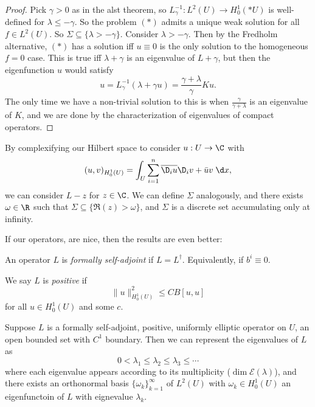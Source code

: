 \documentclass[a4paper]{article}
\begin{document}
\begin{proof}
  Pick $\gamma > 0$ as in the alst theorem, so $L_\gamma^{-1}: L^2(U) \to H_0^1(*U)$ is well-defined for $\lambda \leq -\gamma$. So the problem $(*)$ admits a unique weak solution for all $f \in L^2(U)$. So $\Sigma \subseteq \{\lambda > - \gamma\}$. Consider $\lambda > -\gamma$. Then by the Fredholm alternative, $(*)$ has a solution iff $u \equiv 0$ is the only solution to the homogeneous $f = 0$ case. This is true iff $\lambda + \gamma$ is an eigenvalue of $L + \gamma$, but then the eigenfunction $u$ would satisfy
  \[
    u = L_\gamma^{-1}(\lambda + \gamma u) = \frac{\gamma + \lambda}{\gamma }Ku.
  \]
  The only time we have a non-trivial solution to this is when $\frac{\gamma}{\gamma + \lambda}$ is an eigenvalue of $K$, and we are done by the characterization of eigenvalues of compact operators.
\end{proof}

By complexifying our Hilbert space to consider $u: U \to \C$ with
\[
  (u, v)_{H_0^1(U)} = \int_U \sum_{i = 1}^n \overline{\D_i u} \D_i v + \bar{u} v \;\d x,
\]
we can consider $L - z$ for $z \in \C$. We can define $\Sigma$ analogously, and there exists $\omega \in \R$ such that $\Sigma \subseteq \{\Re (z) > \omega\}$, and $\Sigma$ is a discrete set accumulating only at infinity.

If our operators, are nice, then the results are even better:
\begin{defi}
  An operator $L$ is \emph{formally self-adjoint} if $L = L^\dagger$. Equivalently, if $b^i \equiv 0$.
\end{defi}

\begin{defi}
  We say $L$ is \emph{positive} if
  \[
    \|u\|^2_{H_0^1(U)} \leq C B[u, u]
  \]
  for all $u \in H_0^1(U)$ and some $c$.
\end{defi}

\begin{thm}
  Suppose $L$ is a formally self-adjoint, positive, uniformly elliptic operator on $U$, an open bounded set with $C^1$ boundary. Then we can represent the eigenvalues of $L$ as
  \[
    0 < \lambda_1 \leq \lambda_2 \leq \lambda_3 \leq \cdots
  \]
  where each eigenvalue appears according to its multiplicity ($\dim \mathcal{E}(\lambda)$), and there exists an orthonormal basis $\{\omega_k\}_{k = 1}^\infty$ of $L^2(U)$ with $\omega_k \in H_0^1(U)$ an eigenfunctoin of $L$ with eignevalue $\lambda_k$.
\end{thm}
\end{document}
